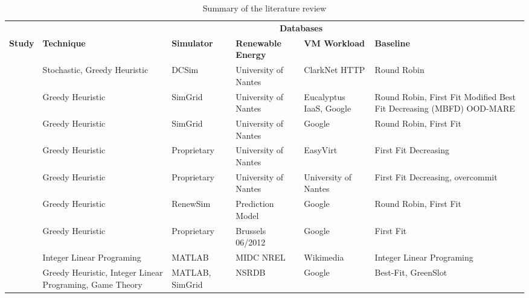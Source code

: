 \documentclass[12pt,a4paper]{article}
\begin{document}
\begin{sidewaystable}
  \centering
  \caption{Summary of the literature review}
\renewcommand{\arraystretch}{1.4}
  \begin{tabular}{p{12em}p{9em}p{6em}p{10em}p{10em}p{9em}} \toprule
  
   &  & & \multicolumn{2}{c}{\textbf{Databases}} &   \\ 
  
    \textbf{Study} & \textbf{Technique} & \textbf{Simulator} & \textbf{Renewable Energy} & \textbf{VM Workload} & \textbf{Baseline}\\ \midrule

    \citet{SAGITTA} & Stochastic, Greedy Heuristic & DCSim & University of Nantes & ClarkNet HTTP  &  Round Robin\\
    

    \citet{NEMESIS} & Greedy Heuristic & SimGrid & University of Nantes & Eucalyptus IaaS, Google  &  Round Robin, First Fit
    Modified Best Fit Decreasing (MBFD)
    OOD-MARE\\

    \citet{SCORPIOUS} & Greedy Heuristic & SimGrid & University of Nantes & Google  &  Round Robin, First Fit\\


    \citet{PIKA} & Greedy Heuristic & Proprietary & University of Nantes & EasyVirt  &  First Fit Decreasing\\

    \citet{li2017} & Greedy Heuristic & Proprietary & University of Nantes & University of Nantes  &  First Fit Decreasing, overcommit\\

    \citet{Courchelle} & Greedy Heuristic & RenewSim  & Prediction Model & Google & Round Robin,  First Fit \\

    \citet{sgeess} & Greedy Heuristic & Proprietary  & Brussels 06/2012 & Google  & First Fit \\

    \citet{gu2016} & Integer Linear Programing & MATLAB  & MIDC NREL & Wikimedia  & Integer Linear Programing \\

    \citet{datazero} & Greedy Heuristic, Integer Linear Programing, Game Theory  & MATLAB, SimGrid & NSRDB & Google & Best-Fit, GreenSlot \\

     \bottomrule
  \end{tabular}
  \label{tab:review}
\end{sidewaystable} 
\end{document}
